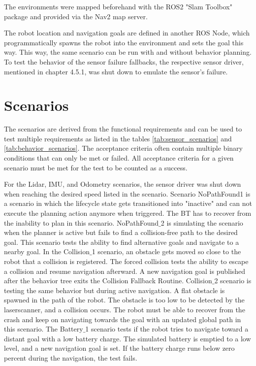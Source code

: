 The environments were mapped beforehand with the ROS2 "Slam Toolbox" package and provided via the Nav2 map server. 

The robot location and navigation goals are defined in another ROS Node, which programmatically spawns the robot into the environment and sets the goal this way. This way, the same scenario can be run with and without behavior planning. To test the behavior of the sensor failure fallbacks, the respective sensor driver, mentioned in chapter 4.5.1, was shut down to emulate the sensor's failure. 

\section{Scenarios}

The scenarios are derived from the functional requirements and can be used to test multiple requirements as listed in the tables \ref{tab:sensor_scenarios} and \ref{tab:behavior_scenarios}.
The acceptance criteria often contain multiple binary conditions that can only be met or failed. All acceptance criteria for a given scenario must be met for the test to be counted as a success.  

For the Lidar, IMU, and Odometry scenarios, the sensor driver was shut down when reaching the desired speed listed in the scenario. 
Scenario NoPathFound1 is a scenario in which the lifecycle state gets transitioned into "inactive" and can not execute the planning action anymore when triggered. The BT has to recover from the inability to plan in this scenario.
NoPathFound$\_$2 is simulating the scenario when the planner is active but fails to find a collision-free path to the desired goal. This scenario tests the ability to find alternative goals and navigate to a nearby goal. 
In the Collision$\_$1 scenario, an obstacle gets moved so close to the robot that a collision is registered. The forced collision tests the ability to escape a collision and resume navigation afterward. A new navigation goal is published after the behavior tree exits the Collision Fallback Routine.
Collision$\_$2 scenario is testing the same behavior but during active navigation. A flat obstacle is spawned in the path of the robot. The obstacle is too low to be detected by the laserscanner, and a collision occurs. The robot must be able to recover from the crash and keep on navigating towards the goal with an updated global path in this scenario. 
The Battery$\_$1 scenario tests if the robot tries to navigate toward a distant goal with a low battery charge. The simulated battery is emptied to a low level, and a new navigation goal is set. If the battery charge runs below zero percent during the navigation, the test fails. 

